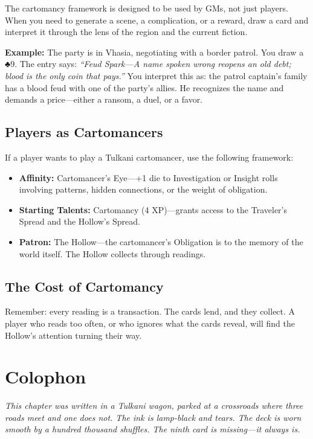 \documentclass[12pt,oneside]{book}
\renewcommand{\clubsuit}{♣}
\begin{document}
The cartomancy framework is designed to be used by GMs, not just players. When you need to generate a scene, a complication, or a reward, draw a card and interpret it through the lens of the region and the current fiction.

\textbf{Example:} The party is in Vhasia, negotiating with a border patrol. You draw a \clubsuit 9. The entry says: \textit{``Feud Spark---A name spoken wrong reopens an old debt; blood is the only coin that pays.''} You interpret this as: the patrol captain's family has a blood feud with one of the party's allies. He recognizes the name and demands a price---either a ransom, a duel, or a favor.

\subsection*{Players as Cartomancers}

If a player wants to play a Tulkani cartomancer, use the following framework:

\begin{itemize}
    \item \textbf{Affinity:} Cartomancer's Eye---+1 die to Investigation or Insight rolls involving patterns, hidden connections, or the weight of obligation.
    \item \textbf{Starting Talents:} Cartomancy (4 XP)---grants access to the Traveler's Spread and the Hollow's Spread.
    \item \textbf{Patron:} The Hollow---the cartomancer's Obligation is to the memory of the world itself. The Hollow collects through readings.
\end{itemize}

\subsection*{The Cost of Cartomancy}

Remember: every reading is a transaction. The cards lend, and they collect. A player who reads too often, or who ignores what the cards reveal, will find the Hollow's attention turning their way.

\section*{Colophon}

\textit{This chapter was written in a Tulkani wagon, parked at a crossroads where three roads meet and one does not. The ink is lamp-black and tears. The deck is worn smooth by a hundred thousand shuffles. The ninth card is missing---it always is.}
\end{document}
